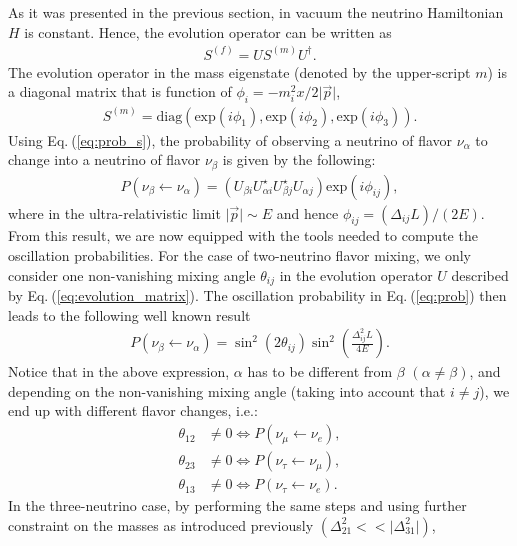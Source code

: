 \documentclass[twocolumn,secnumarabic,amssymb, nobibnotes, aps, prd,10pt]{revtex4-1}
\newcommand{\Eq}[1]{Eq.$\:$(\ref{#1})}
\begin{document}
As it was presented in the previous section, in vacuum the neutrino Hamiltonian $H$ is
constant. Hence, the evolution operator can be written as
\begin{align}
S^{(f)} = U S^{(m)} U^\dagger .
\end{align}
The evolution operator in the mass eigenstate (denoted by the upper-script $m$) is a 
diagonal matrix that is function of $\phi_i = -m_i^2 x / 2 \vert \vec{p} \vert$,
\begin{align}
S^{(m)} = \mathrm{diag} \left( \mathrm{exp}(i \phi_1), \mathrm{exp}(i \phi_2), 
\mathrm{exp}(i \phi_3) \right) .
\end{align}
Using \Eq{eq:prob_s}, the probability of observing a neutrino of flavor 
$\nu_\alpha$ to change into a neutrino of flavor $\nu_\beta$ is given by the following:
\begin{align}
P (\nu_\beta \longleftarrow \nu_\alpha) = \left( U_{\beta i} U^\star_{\alpha i} 
U^\star_{\beta j} U_{\alpha j} \right) \mathrm{exp}(i \phi_{ij}),
\label{eq:prob}
\end{align}
where in the ultra-relativistic limit $\vert \vec{p} \vert \sim E$ and hence
$\phi_{ij} = \left( \Delta_{ij} L \right) / (2 E)$.
From this result, we are now equipped with the tools needed to compute the oscillation
probabilities. For the case of two-neutrino flavor mixing, we only consider one 
non-vanishing mixing angle $\theta_{ij}$ in the evolution operator $U$ described
by \Eq{eq:evolution_matrix}. The oscillation probability in \Eq{eq:prob} then leads
to the following well known result
\begin{align}
P (\nu_\beta \longleftarrow \nu_\alpha) = \sin^2 (2 \theta_{ij}) \sin^2 \left(
\frac{\Delta_{ij}^2 L}{4 E} \right) .
\label{eq:2OscProb}
\end{align}
Notice that in the above expression, $\alpha$ has to be different from $\beta$ 
$(\alpha \neq \beta)$, and depending on the non-vanishing mixing angle (taking into
account that $i \neq j$), we end up with different flavor changes, i.e.:
\begin{align}
\theta_{12} & \neq 0 \Longleftrightarrow P (\nu_\mu \longleftarrow \nu_e), \\
\theta_{23} & \neq 0 \Longleftrightarrow P (\nu_\tau \longleftarrow \nu_\mu), \\
\theta_{13} & \neq 0 \Longleftrightarrow P (\nu_\tau \longleftarrow \nu_e) .
\end{align}
In the three-neutrino case, by performing the same steps and using further constraint
on the masses as introduced previously $(\Delta_{21}^2 << \vert \Delta_{31}^2 \vert)$,
\end{document}
